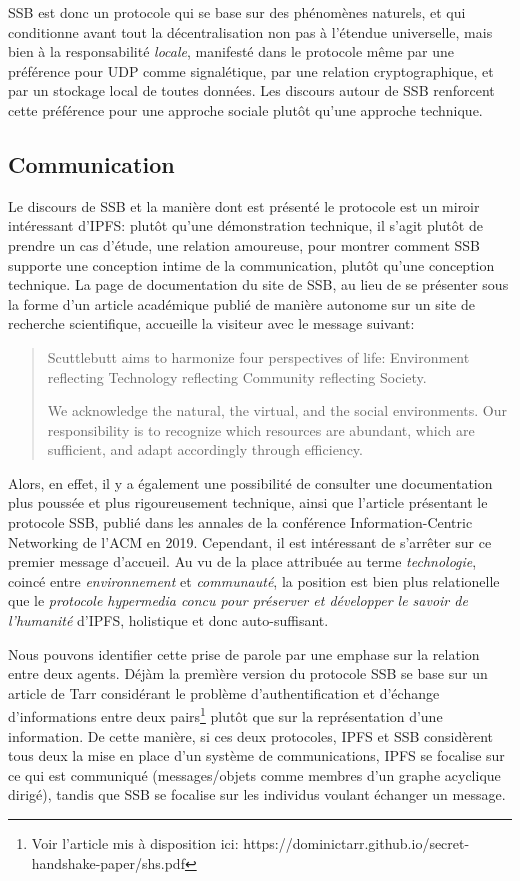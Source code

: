 \documentclass{article}
\begin{document}
SSB est donc un protocole qui se base sur des phénomènes naturels, et qui conditionne avant tout la décentralisation non pas à l'étendue universelle, mais bien à la responsabilité \emph{locale}, manifesté dans le protocole même par une préférence pour UDP comme signalétique, par une relation cryptographique, et par un stockage local de toutes données. Les discours autour de SSB renforcent cette préférence pour une approche sociale plutôt qu'une approche technique.

\subsection{Communication}

Le discours de SSB et la manière dont est présenté le protocole est un miroir intéressant d'IPFS: plutôt qu'une démonstration technique, il s'agit plutôt de prendre un cas d'étude, une relation amoureuse, pour montrer comment SSB supporte une conception intime de la communication, plutôt qu'une conception technique\cite{mandeville_scuttlebutt_nodate}. La page de documentation du site de SSB, au lieu de se présenter sous la forme d'un article académique publié de manière autonome sur un site de recherche scientifique, accueille la visiteur avec le message suivant:

\begin{quote}
    Scuttlebutt aims to harmonize four perspectives of life: Environment reflecting Technology reflecting Community reflecting Society.

    We acknowledge the natural, the virtual, and the social environments. Our responsibility is to recognize which resources are abundant, which are sufficient, and adapt accordingly through efficiency.
\end{quote}

Alors, en effet, il y a également une possibilité de consulter une documentation plus poussée et plus rigoureusement technique, ainsi que l'article présentant le protocole SSB, publié dans les annales de la conférence Information-Centric Networking de l'ACM en 2019\cite{tarr_secure_2019}. Cependant, il est intéressant de s'arrêter sur ce premier message d'accueil. Au vu de la place attribuée au terme \emph{technologie}, coincé entre \emph{environnement} et \emph{communauté}, la position est bien plus relationelle que le \emph{protocole hypermedia concu pour préserver et développer le savoir de l'humanité} d'IPFS, holistique et donc auto-suffisant.

Nous pouvons identifier cette prise de parole par une emphase sur la relation entre deux agents. Déjàm la premìère version du protocole SSB se base sur un article de Tarr considérant le problème d'authentification et d'échange d'informations entre deux pairs\footnote{Voir l'article mis à disposition ici: https://dominictarr.github.io/secret-handshake-paper/shs.pdf} plutôt que sur la représentation d'une information. De cette manière, si ces deux protocoles, IPFS et SSB considèrent tous deux la mise en place d'un système de communications, IPFS se focalise sur ce qui est communiqué (messages/objets comme membres d'un graphe acyclique dirigé), tandis que SSB se focalise sur les individus voulant échanger un message.
\end{document}
